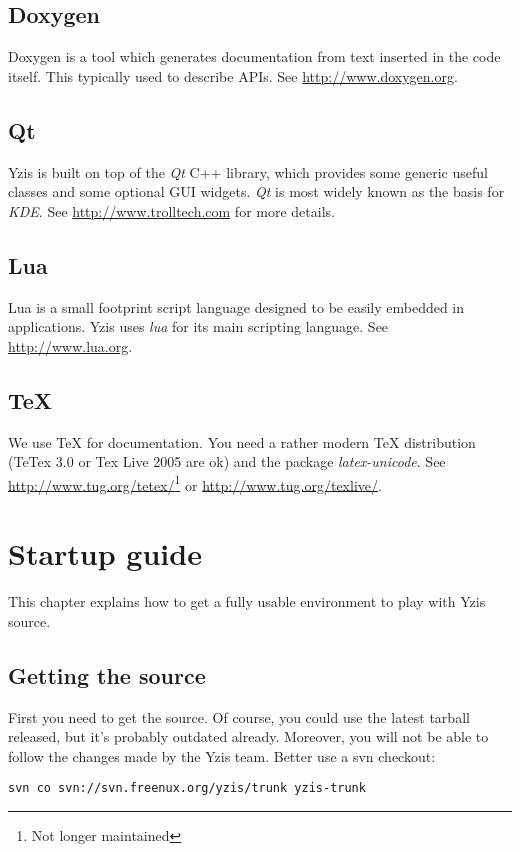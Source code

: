 \documentclass[a4paper,12pt]{report}
\begin{document}
\section{Doxygen}
Doxygen is a tool which generates documentation from text inserted in the
code itself. This typically used to describe APIs.
See \url{http://www.doxygen.org}.

\section{Qt}
Yzis is built on top of the \emph{Qt} C++ library, which provides some
generic useful classes and some optional GUI widgets. \emph{Qt} is most
widely known as the basis for \emph{KDE}.
See \url{http://www.trolltech.com} for more details.

\section{Lua}
Lua is a small footprint script language designed to be easily embedded in
applications. Yzis uses \emph{lua} for its main scripting language. See
\url{http://www.lua.org}.

\section{\TeX}
We use {\TeX} for documentation. You need a rather modern {\TeX} distribution
(TeTex 3.0 or Tex Live 2005 are ok) and the package \emph{latex-unicode}.
See \url{http://www.tug.org/tetex/}\footnote{Not longer
maintained} or \url{http://www.tug.org/texlive/}.

\chapter{Startup guide}
This chapter explains how to get a fully usable environment to play with
Yzis source.

\section{Getting the source}
First you need to get the source. Of course, you could use the latest
tarball released, but it's probably outdated already. Moreover, you will
not be able to follow the changes made by the Yzis team.
Better use a svn checkout:

\begin{verbatim}
svn co svn://svn.freenux.org/yzis/trunk yzis-trunk
\end{verbatim}
\end{document}

